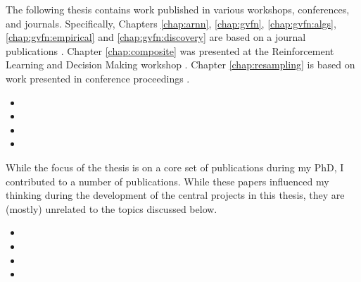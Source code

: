 \documentclass[\main/thesis.tex]{subfiles}
\begin{document}
\begin{preface}

The following thesis contains work published in various workshops, conferences, and journals.
Specifically, Chapters \ref{chap:arnn}, \ref{chap:gvfn}, \ref{chap:gvfn:algs}, \ref{chap:gvfn:empirical} and \ref{chap:gvfn:discovery} are based on a journal publications \cite{schlegel2021general, schlegel2022investigating}. Chapter \ref{chap:composite} was presented at the Reinforcement Learning and Decision Making workshop \cite{schlegel2022predictions}. Chapter \ref{chap:resampling} is based on work presented in conference proceedings \cite{schlegel2019importance}.

\begin{itemize}
\item[\cite{schlegel2019importance}] 
\item[\cite{schlegel2021general}] 
\item[\cite{schlegel2022predictions}] 
\item[\cite{schlegel2022investigating}] 
\end{itemize}

While the focus of the thesis is on a core set of publications during
my PhD, I contributed to a number of publications. While these papers
influenced my thinking during the development of the central projects
in this thesis, they are (mostly) unrelated to the topics discussed
below.

\begin{itemize}
\item[\cite{kumaraswamy2018context}] 
\item[\cite{jacobsen2019meta}] 
\item[\cite{gupta2021structural}] 
\item[\cite{mcleod2021continual}] 
\end{itemize}

\end{preface}
\end{document}

